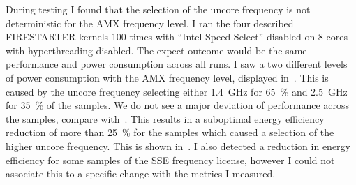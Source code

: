 During testing I found that the selection of the uncore frequency is not deterministic for the AMX frequency level.
I ran the four described FIRESTARTER kernels \SI{100}{} times with ``Intel Speed Select'' disabled on \SI{8}{} cores with hyperthreading disabled.
The expect outcome would be the same performance and power consumption across all runs.
I saw a two different levels of power consumption with the AMX frequency level, displayed in~.
This is caused by the uncore frequency selecting either \SI{1.4}{\GHz} for \SI{65}{\percent} and \SI{2.5}{\GHz} for \SI{35}{\percent} of the samples.
We do not see a major deviation of performance across the samples, compare with~.
This results in a suboptimal energy efficiency reduction of more than \SI{25}{\percent} for the samples which caused a selection of the higher uncore frequency.
This is shown in~.
I also detected a reduction in energy efficiency for some samples of the SSE frequency license, however I could not associate this to a specific change with the metrics I measured.


